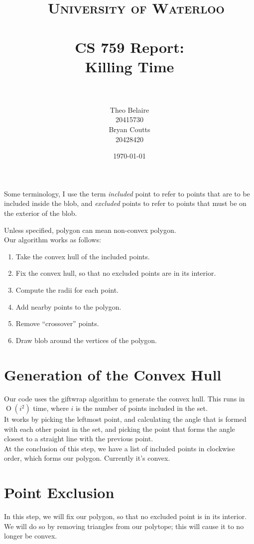\documentclass[paper=a4, fontsize=11pt]{scrartcl} %
\title{\
    \normalfont\normalsize
    \textsc{University of Waterloo} \\ [25pt] %
    \horrule{0.5pt} \\[0.4cm] %
    \huge CS 759 Report:\\
    Killing Time \\
    \horrule{2pt} \\[0.5cm] %
}
\author{Theo Belaire \\ 20415730 \\ Bryan Coutts \\ 20428420} %
\date{\normalsize\today} %
\numberwithin{equation}{section} %
\numberwithin{figure}{section} %
\numberwithin{table}{section} %
\DeclareMathOperator{\OO}{O}
\begin{document}
\maketitle %


Some terminology, I use the term \textit{included} point to refer to points
that are to be included inside the blob, and \textit{excluded} points to refer
to points that must be on the exterior of the blob.

Unless specified, polygon can mean non-convex polygon. \\

Our algorithm works as follows:
\begin{enumerate}
\item Take the convex hull of the included points.
\item Fix the convex hull, so that no excluded points are in its interior.
\item Compute the radii for each point.
\item Add nearby points to the polygon. 
\item Remove ``crossover'' points.
\item Draw blob around the vertices of the polygon.
\end{enumerate}


\section{Generation of the Convex Hull}
Our code uses the giftwrap algorithm to generate the convex hull.
This runs in $\OO(i^2)$ time, where $i$ is the number of points included in the
set. \\

It works by picking the leftmost point, and calculating the angle that is
formed with each other point in the set, and picking the point that forms
the angle closest to a straight line with the previous point. \\

At the conclusion of this step, we have a list of included points in clockwise
order, which forms our polygon.  Currently it's convex.

\section{Point Exclusion}
In this step, we will fix our polygon, so that no excluded point is in its
interior. We will do so by removing triangles from our polytope; this will cause
it to no longer be convex. \\
\end{document}
